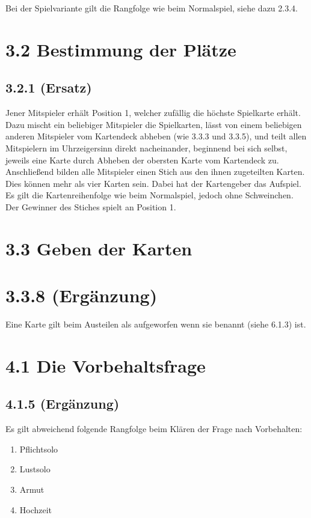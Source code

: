 Bei der Spielvariante  gilt die Rangfolge wie beim Normalspiel,
siehe dazu 2.3.4.

\section*{3.2 Bestimmung der Plätze}

\subsection*{3.2.1 (Ersatz)}

Jener Mitspieler erhält Position 1, welcher zufällig die höchste
Spielkarte erhält. Dazu mischt ein beliebiger Mitspieler die
Spielkarten, lässt von einem beliebigen anderen Mitspieler vom
Kartendeck abheben (wie 3.3.3 und 3.3.5), und teilt allen Mitspielern im
Uhrzeigersinn direkt nacheinander, beginnend bei sich selbst, jeweils
eine Karte durch Abheben der obersten Karte vom Kartendeck zu.
Anschließend bilden alle Mitspieler einen Stich aus den ihnen
zugeteilten Karten. Dies können mehr als vier Karten sein. Dabei hat
der Kartengeber das Aufspiel. Es gilt die Kartenreihenfolge wie beim
Normalspiel, jedoch ohne Schweinchen. Der Gewinner des Stiches spielt an
Position 1.

\section*{3.3 Geben der Karten}

\section*{3.3.8 (Ergänzung)}

Eine Karte gilt beim Austeilen als aufgeworfen wenn sie benannt (siehe 6.1.3) ist.

\section*{4.1 Die Vorbehaltsfrage}

\subsection*{4.1.5 (Ergänzung)}

Es gilt abweichend folgende Rangfolge beim Klären der Frage nach
Vorbehalten:

\begin{enumerate}
    \item Pflichtsolo
    \item Lustsolo
    \item Armut
    \item Hochzeit
\end{enumerate}

